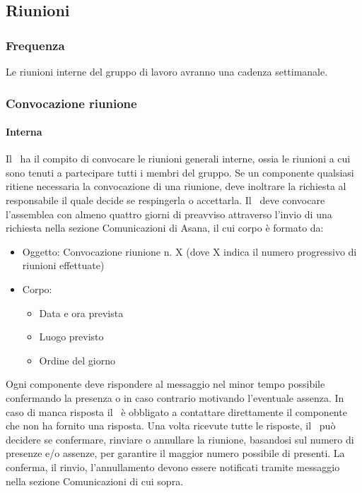 \documentclass[../NormeDiProgetto.tex]{subfiles}
\begin{document}
			\subsection{Riunioni}
				\subsubsection{Frequenza}
					Le riunioni interne del gruppo di lavoro avranno una cadenza settimanale.
				\subsubsection{Convocazione riunione}
					\paragraph{Interna\\}
						Il \responsabilediprogetto\ ha il compito di convocare le riunioni generali interne, ossia
						le riunioni a cui sono tenuti a partecipare tutti i membri del gruppo.
						Se un componente qualsiasi ritiene necessaria la convocazione di una riunione, deve
						inoltrare la richiesta al responsabile il quale decide se respingerla o accettarla.
						Il \responsabilediprogetto\ deve convocare l'assemblea con almeno quattro giorni di preavviso
						attraverso l'invio di una richiesta nella sezione Comunicazioni di Asana, il cui
						corpo è formato da:
						\begin{itemize}
							\item Oggetto: Convocazione riunione n. X (dove X indica il numero progressivo
							di riunioni effettuate)
							\item Corpo:
							\begin{itemize}
								\item Data e ora prevista
								\item Luogo previsto
								\item Ordine del giorno
							\end{itemize}
						\end{itemize}
						Ogni componente deve rispondere al messaggio nel minor tempo possibile confermando
						la presenza o in caso contrario motivando l'eventuale assenza. In caso di manca risposta
						il \responsabilediprogetto\ è obbligato a contattare direttamente il componente che non
						ha fornito una risposta. Una volta ricevute tutte le risposte, il \responsabilediprogetto\
						può decidere se confermare, rinviare o annullare la riunione, basandosi sul numero di
						presenze e/o assenze, per garantire il maggior numero possibile di presenti. La conferma, il rinvio,
						l'annullamento devono essere notificati tramite messaggio nella sezione Comunicazioni di cui
						sopra.
\end{document}
